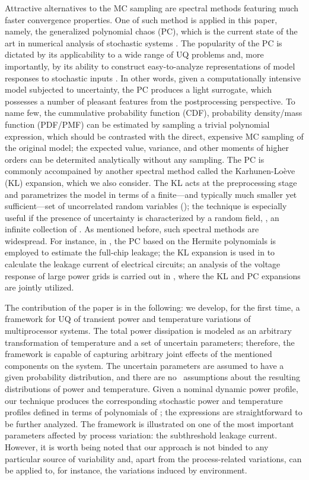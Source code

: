 Attractive alternatives to the MC sampling are spectral methods \cite{xiu2010, maitre2010, ghanem1991} featuring much faster convergence properties. One of such method is applied in this paper, namely, the generalized polynomial chaos (PC), which is the current state of the art in numerical analysis of stochastic systems \cite{xiu2010}. The popularity of the PC is dictated by its applicability to a wide range of UQ problems and, more importantly, by its ability to construct easy-to-analyze representations of model responses to stochastic inputs \cite{eldred2009}. In other words, given a computationally intensive model subjected to uncertainty, the PC produces a light surrogate, which possesses a number of pleasant features from the postprocessing perspective. To name few, the cummulative probability function (CDF), probability density/mass function (PDF/PMF) can be estimated by sampling a trivial polynomial expression, which should be contrasted with the direct, expensive MC sampling of the original model; the expected value, variance, and other moments of higher orders can be determited analytically without any sampling. The PC is commonly accompained by another spectral method called the Karhunen-Lo\`{e}ve (KL) expansion, which we also consider. The KL acts at the preprocessing stage and parametrizes the model in terms of a finite---and typically much smaller yet sufficient---set of uncorrelated random variables (\rvs); the technique is especially useful if the presence of uncertainty is characterized by a random field, \ie, an infinite collection of \rvs. As mentioned before, such spectral methods are widespread. For instance, in \cite{shen2009}, the PC based on the Hermite polynomials is employed to estimate the full-chip leakage; the KL expansion is used in \cite{bhardwaj2006} to calculate the leakage current of electrical circuits; an analysis of the voltage response of large power grids is carried out in \cite{ghanta2006}, where the KL and PC expansions are jointly utilized.

The contribution of the paper is in the following: we develop, for the first time, a framework for UQ of transient power and temperature variations of multiprocessor systems. The total power dissipation is modeled as an arbitrary transformation of temperature and a set of uncertain parameters; therefore, the framework is capable of capturing arbitrary joint effects of the mentioned components on the system. The uncertain parameters are assumed to have a given probability distribution, and there are no \apriori\ assumptions about the resulting distributions of power and temperature. Given a nominal dynamic power profile, our technique produces the corresponding stochastic power and temperature profiles defined in terms of polynomials of \rvs; the expressions are straightforward to be further analyzed. The framework is illustrated on one of the most important parameters affected by process variation: the subthreshold leakage current. However, it is worth being noted that our approach is not binded to any particular source of variability and, apart from the process-related variations, can be applied to, for instance, the variations induced by environment.

